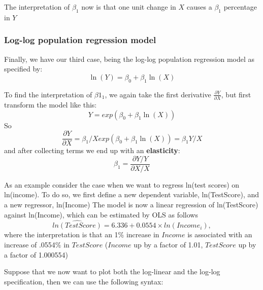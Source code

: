 \documentclass[
]{book}
\begin{document}
The interpretation of \(\beta_1\) now is that one unit change in \(X\) causes a \(\beta_1\) percentage in \(Y\)

\hypertarget{log-log-population-regression-model}{%
\subsubsection{Log-log population regression model}\label{log-log-population-regression-model}}

Finally, we have our third case, being the log-log population regression model as specified by:
\begin{equation}
    \ln(Y) = \beta_0 + \beta_1 \ln(X)
\end{equation}

To find the interpretation of \(\beta1_1\), we again take the first derivative \(\frac{\partial Y}{\partial X}\), but first transform the model like this:
\begin{equation}
    Y = exp( \beta_0 + \beta_1 \ln(X) )
\end{equation}
So
\begin{equation}
    \frac{\partial Y}{\partial X} = \beta_1 /X  exp( \beta_0 + \beta_1 \ln(X) ) = \beta_1 Y /X
\end{equation}
and after collecting terms we end up with an \textbf{elasticity}:
\begin{equation}
    \beta_1  = \frac{\partial Y / Y}{\partial X / X } 
\end{equation}

As an example consider the case when we want to regress ln(test scores) on ln(income). To do so, we first define a new dependent variable, ln(TestScore), and a new regressor, ln(Income)
The model is now a linear regression of ln(TestScore) against ln(Income), which can be estimated by OLS as follows
\begin{equation}
\widehat{ln(TestScore)} = 6.336 + 0.0554 \times ln(Income_i),
\end{equation}
where the interpretation is that an 1\% increase in \(Income\) is associated with an increase of .0554\% in \(TestScore\) (\(Income\) up by a factor of 1.01, \(TestScore\) up by a factor of 1.000554)

Suppose that we now want to plot both the log-linear and the log-log specification, then we can use the following syntax:
\end{document}
